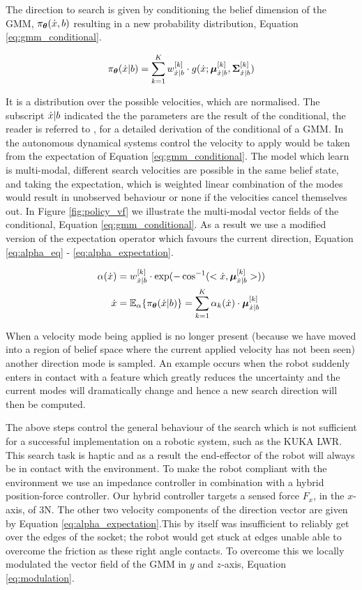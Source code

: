 The direction to search is given by conditioning 
the belief dimension of the GMM, $\pi_{\boldsymbol{\theta}}(\dot{x},b)$ resulting in a new 
probability distribution, Equation \ref{eq:gmm_conditional}.

\begin{equation}\label{eq:gmm_conditional}
 \pi_{\boldsymbol{\theta}}(\dot{x}|b) = \sum_{k=1}^{K} w^{[k]}_{\dot{x}|b} \cdot g(\dot{x};\boldsymbol{\mu}^{[k]}_{\dot{x}|b},\boldsymbol{\Sigma}^{[k]}_{\dot{x}|b})
\end{equation}

It is a distribution over the possible velocities, which are 
normalised. The subscript $\dot{x}|b$ indicated the the parameters 
are the result of the conditional, the reader is referred to \cite{gesture_calinon_2010},\cite{gmr_2004} for 
a detailed derivation of the conditional of a GMM. In the autonomous
dynamical systems control the velocity to apply would be taken from 
the expectation of Equation \ref{eq:gmm_conditional}. The model 
which learn is multi-modal, different search velocities are possible 
in the same belief state, and taking the expectation, which is weighted 
linear combination of the modes would result in unobserved behaviour or 
none if the velocities cancel themselves out. In Figure \ref{fig:policy_vf}
we illustrate the multi-modal vector fields of the conditional, Equation \ref{eq:gmm_conditional}.
As a result we use a modified version of the expectation operator which favours the current
direction, Equation \ref{eq:alpha_eq} - \ref{eq:alpha_expectation}.

\begin{align}
 \alpha(\dot{x}) &= w^{[k]}_{\dot{x}|b} \cdot \exp(-\cos^{-1}(<\dot{x},\boldsymbol{\mu}^{[k]}_{\dot{x}|b}>)) \label{eq:alpha_eq}\\
 \dot{x} &= \mathbb{E}_{\alpha}\{\pi_{\boldsymbol{\theta}}(\dot{x}|b)\} = \sum_{k=1}^K \alpha_k(\dot{x}) \cdot \boldsymbol{\mu}^{[k]}_{\dot{x}|b} \label{eq:alpha_expectation}
\end{align}

When a velocity mode being applied is no longer present (because we have moved into a region of belief space where the current applied 
velocity has not been seen) another direction mode is sampled. An example occurs when the robot suddenly enters in contact with a feature
which greatly reduces the uncertainty and the current modes will dramatically change and hence a new search direction will then 
be computed. 

The above steps control the general behaviour of the search which is not sufficient for a successful implementation on a robotic system, such 
as the KUKA LWR.
This search task is haptic and as a result the end-effector of the robot will always be in contact with the environment. To make the robot
compliant with the environment we use an impedance controller in combination with a hybrid position-force controller. Our hybrid controller
targets a sensed force $F_x$, in the $x$-axis, of 3N. The other two velocity components of the direction vector are given by 
Equation \ref{eq:alpha_expectation}.This by itself was insufficient to reliably get over the edges of the socket; the robot 
would get stuck at edges unable able to overcome the friction as these right angle contacts. To overcome this we locally modulated 
the vector field of the GMM in $y$ and $z$-axis, Equation \ref{eq:modulation}.

